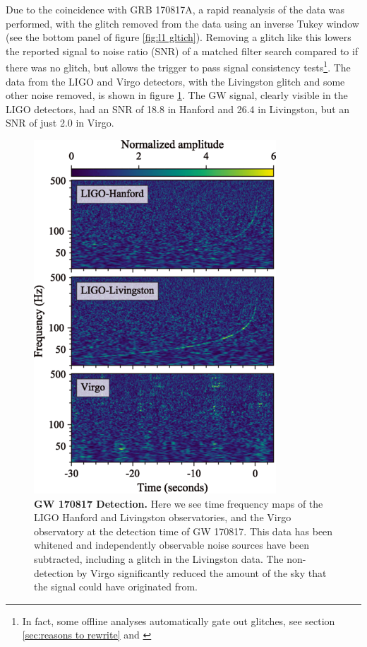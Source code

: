 \documentclass[11pt]{cuthesis}
\begin{document}
Due to the coincidence with GRB 170817A, a rapid reanalysis of the data was performed, with the glitch removed from the data using an inverse Tukey window (see the bottom panel of figure \ref{fig:l1 gltich}). Removing a glitch like this lowers the reported signal to noise ratio (SNR) of a matched filter search compared to if there was no glitch, but allows the trigger to pass signal consistency tests\footnote{In fact, some offline analyses automatically gate out glitches, see section \ref{sec:reasons to rewrite} and \cite{pycbc_Usman:2015}}. The data from the LIGO and Virgo detectors, with the Livingston glitch and some other noise removed, is shown in figure \ref{fig:170817 ifo strain}. The GW signal, clearly visible in the LIGO detectors, had an SNR of 18.8 in Hanford and 26.4 in Livingston, but an SNR of just 2.0 in Virgo.

\begin{figure} %
\begin{center}
\includegraphics[width=0.8\linewidth]{gw170817_ifo_strain.png}
\end{center}
\caption{\textbf{GW 170817 Detection.} Here we see time frequency maps of the LIGO Hanford and Livingston observatories, and the Virgo observatory at the detection time of GW 170817. This data has been whitened and independently observable noise sources have been subtracted, including a glitch in the Livingston data. The non-detection by Virgo significantly reduced the amount of the sky that the signal could have originated from.\cite{GW170817_det}}
\label{fig:170817 ifo strain}
\end{figure}
\end{document}
